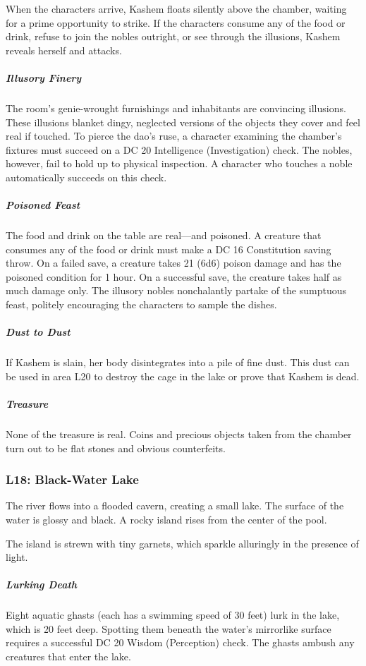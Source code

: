\documentclass[10pt,a4paper,twoside,bg=print,twocolumn,openany,nodeprecatedcode]{dndbook}
\begin{document}
When the characters arrive, Kashem floats silently above the chamber, waiting for a prime opportunity to strike. If the characters consume any of the food or drink, refuse to join the nobles outright, or see through the illusions, Kashem reveals herself and attacks.

\subparagraph{Illusory Finery}
The room's genie-wrought furnishings and inhabitants are convincing illusions. These illusions blanket dingy, neglected versions of the objects they cover and feel real if touched. To pierce the dao's ruse, a character examining the chamber's fixtures must succeed on a DC 20 Intelligence (Investigation) check. The nobles, however, fail to hold up to physical inspection. A character who touches a noble automatically succeeds on this check.

\subparagraph{Poisoned Feast}
The food and drink on the table are real—and poisoned. A creature that consumes any of the food or drink must make a DC 16 Constitution saving throw. On a failed save, a creature takes 21 (6d6) poison damage and has the poisoned condition for 1 hour. On a successful save, the creature takes half as much damage only. The illusory nobles nonchalantly partake of the sumptuous feast, politely encouraging the characters to sample the dishes.

\subparagraph{Dust to Dust}
If Kashem is slain, her body disintegrates into a pile of fine dust. This dust can be used in area L20 to destroy the cage in the lake or prove that Kashem is dead.

\subparagraph{Treasure}
None of the treasure is real. Coins and precious objects taken from the chamber turn out to be flat stones and obvious counterfeits.

\subsubsection{L18: Black-Water Lake}
\begin{DndReadAloud}{}
The river flows into a flooded cavern, creating a small lake. The surface of the water is glossy and black. A rocky island rises from the center of the pool.

\end{DndReadAloud}

The island is strewn with tiny garnets, which sparkle alluringly in the presence of light.

\subparagraph{Lurking Death}
Eight aquatic ghasts (each has a swimming speed of 30 feet) lurk in the lake, which is 20 feet deep. Spotting them beneath the water's mirrorlike surface requires a successful DC 20 Wisdom (Perception) check. The ghasts ambush any creatures that enter the lake.
\end{document}
